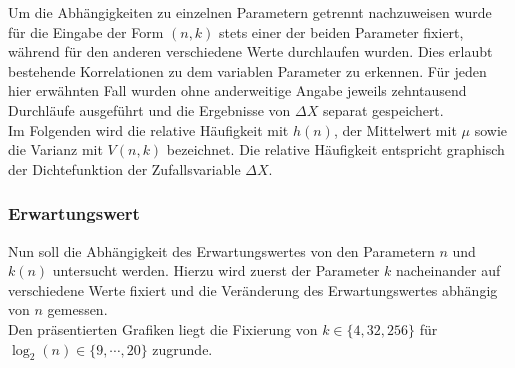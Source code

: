 \noindent
Um die Abhängigkeiten zu einzelnen Parametern getrennt nachzuweisen wurde für die Eingabe der Form $(n,k)$ stets einer der beiden Parameter fixiert, während für den anderen verschiedene Werte durchlaufen wurden. Dies erlaubt bestehende Korrelationen zu dem variablen Parameter zu erkennen. Für jeden hier erwähnten Fall wurden ohne anderweitige Angabe jeweils zehntausend Durchläufe ausgeführt und die Ergebnisse von $\Delta X$ separat gespeichert.\\[0.05cm]

\noindent
Im Folgenden wird die relative Häufigkeit mit $h(n)$, der Mittelwert mit $\mu$ sowie die Varianz mit $V(n,k)$ bezeichnet. Die relative Häufigkeit entspricht graphisch der Dichtefunktion der Zufallsvariable $\Delta X$.

\subsubsection*{Erwartungswert}
Nun soll die Abhängigkeit des Erwartungswertes von den Parametern $n$ und $k(n)$ untersucht werden. Hierzu wird zuerst der Parameter $k$ nacheinander auf verschiedene Werte fixiert und die Veränderung des Erwartungswertes abhängig von $n$ gemessen.\\[.1cm]
Den präsentierten Grafiken liegt die Fixierung von $k\in\{4, 32, 256\}$ für $\log_2(n)\in\{9,\cdots, 20\}$ zugrunde.

